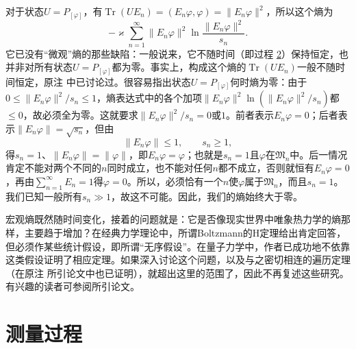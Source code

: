 \documentclass[fontsize=13pt,twoside,openany,headings=normal,parskip=false,bookmarkpackage=false,DIV=calc]{scrbook}
\begin{document}
对于状态$U=P_{[\varphi]}$，有$\operatorname{Tr}(UE_n)=(E_n\varphi,\allowbreak \varphi)=\|E_n\varphi\|^2$，所以这个熵为
\[
-\varkappa\sum_{n=1}^{\infty}\|E_n\varphi\|^2\ln\frac{\|E_n\varphi\|^2}{s_n}.
\]
它已没有“微观”熵的那些缺陷：一般说来，它不随时间（即过程 \hyperref[eq:V.1.2]{2}）保持恒定，也并非对所有状态$U=P_{[\varphi]}$都为零。事实上，构成这个熵的$\operatorname{Tr}(UE_n)$一般不随时间恒定，原注 \hyperlink{note-202}{} 中已讨论过。很容易指出状态$U=P_{[\varphi]}$何时熵为零：由于$0\leq\|E_n\varphi\|^2/s_n\leq1$，熵表达式中的各个加项$\|E_n\varphi\|^2\ln(\|E_n\varphi\|^2/s_n)$都$\leq0$，故必须全为零。这就要求$\|E_n\varphi\|^2/s_n=0$或$1$。前者表示$E_n\varphi=0$；后者表示$\|E_n\varphi\|=\sqrt{s_n}$，但由
\[
\|E_n\varphi\|\leq1,\qquad s_n\geq1,
\]
得$s_n=1$、$\|E_n\varphi\|=\|\varphi\|$，即$E_n\varphi=\varphi$；也就是$s_n=1$且$\varphi$在$\mathfrak M_n$中。后一情况肯定不能对两个不同的$n$同时成立，也不能对任何$n$都不成立，否则就恒有$E_n\varphi=0$，再由$\sum_{n=1}^{\infty}E_n=1$得$\varphi=0$。所以，必须恰有一个$n$使$\varphi$属于$\mathfrak M_n$，而且$s_n=1$。我们已知一般所有$s_n\gg1$，故这不可能。因此，我们的熵始终大于零。

宏观熵既然随时间变化，接着的问题就是：它是否像现实世界中唯象热力学的熵那样，主要趋于增加？在经典力学理论中，所谓Boltzmann的H定理给出肯定回答，\hypertarget{origpage-222}{}\label{origpage-222}但必须作某些统计假设，即所谓“无序假设”。在量子力学中，作者已成功地不依靠这类假设证明了相应定理。如果深入讨论这个问题，以及与之密切相连的遍历定理（在原注 \hyperlink{note-206}{} 所引论文中也已证明），就超出这里的范围了，因此不再复述这些研究。有兴趣的读者可参阅所引论文。


\chapter{测量过程}\label{chap:VI}
\end{document}
